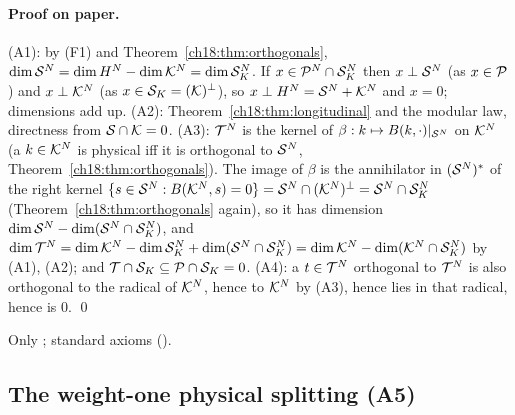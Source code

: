 \paragraph{Proof on paper.}  (A1): by (F1) and Theorem~\ref{ch18:thm:orthogonals},
$\dim\mathcal{S}^N=\dim H^N-\dim\mathcal{K}^N=\dim\mathcal{S}_K^N$.  If $x\in\mathcal{P}^N\cap\mathcal{S}_K^N$ then $x\perp\mathcal{S}^N$ (as $x\in\mathcal{P}$) and $x\perp\mathcal{K}^N$ (as
$x\in\mathcal{S}_K=(\mathcal{K})^\perp$), so $x\perp H^N=\mathcal{S}^N+\mathcal{K}^N$ and $x=0$; dimensions add up.  (A2): Theorem~\ref{ch18:thm:longitudinal} and the
modular law, directness from $\mathcal{S}\cap\mathcal{K}=0$.  (A3): $\mathcal{T}^N$ is the kernel of $\beta:k\mapsto B(k,\cdot)|_{\mathcal{S}^N}$ on
$\mathcal{K}^N$ (a $k\in\mathcal{K}^N$ is physical iff it is orthogonal to $\mathcal{S}^N$, Theorem~\ref{ch18:thm:orthogonals}).  The image of $\beta$
is the annihilator in $(\mathcal{S}^N)^*$ of the right kernel $\{s\in\mathcal{S}^N:B(\mathcal{K}^N,s)=0\}=\mathcal{S}^N\cap(\mathcal{K}^N)^\perp=\mathcal{S}^N\cap\mathcal{S}_K^N$
(Theorem~\ref{ch18:thm:orthogonals} again), so it has dimension $\dim\mathcal{S}^N-\dim(\mathcal{S}^N\cap\mathcal{S}_K^N)$, and
$\dim\mathcal{T}^N=\dim\mathcal{K}^N-\dim\mathcal{S}_K^N+\dim(\mathcal{S}^N\cap\mathcal{S}_K^N)=\dim\mathcal{K}^N-\dim(\mathcal{K}^N\cap\mathcal{S}_K^N)$ by (A1), (A2); and $\mathcal{T}\cap\mathcal{S}_K\subseteq\mathcal{P}\cap\mathcal{S}_K=0$.
(A4): a $t\in\mathcal{T}^N$ orthogonal to $\mathcal{T}^N$ is also orthogonal to the radical of $\mathcal{K}^N$, hence to $\mathcal{K}^N$ by (A3),
hence lies in that radical, hence is $0$. \qed
\begin{status}Only ; standard axioms ().\end{status}

\subsection{The weight-one physical splitting (A5)}

